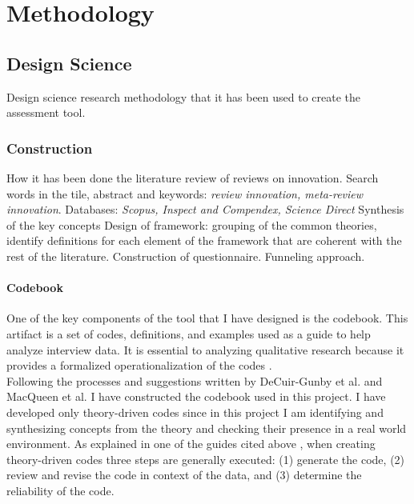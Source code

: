 
\chapter{Methodology} %

\label{Chapter3} %



\section{Design Science}
Design science research methodology that it has been used to create the assessment tool.

\subsection{Construction}
\label{subsec:Construction}
How it has been done the literature review of reviews on innovation. Search words in the tile, abstract and keywords: \textit{review innovation, meta-review innovation}. Databases: \textit{Scopus, Inspect and Compendex, Science Direct}
Synthesis of the key concepts
Design of framework: grouping of the common theories, identify definitions for each element of the framework that are coherent with the rest of the literature.
Construction of questionnaire. Funneling approach.
\subsubsection*{Codebook}
One of the key components of the tool that I have designed is the codebook. This artifact is a set of codes, definitions, and examples used as a guide to help analyze interview data. It is essential to analyzing qualitative research because it provides a formalized operationalization of the codes \citep{CodebookGuide}. \\
Following the processes and suggestions written by DeCuir-Gunby et al. \citep{CodebookGuide} and MacQueen et al. \citep{CodebookGuide2} I have constructed the codebook used in this project.
I have developed only theory-driven codes since in this project I am identifying and synthesizing concepts from the theory and checking their presence in a real world environment. As explained in one of the guides cited above \citep{CodebookGuide}, when creating theory-driven codes three steps are generally executed: (1) generate the code, (2) review and revise the code in context of the data, and (3) determine the reliability of the code. \\

